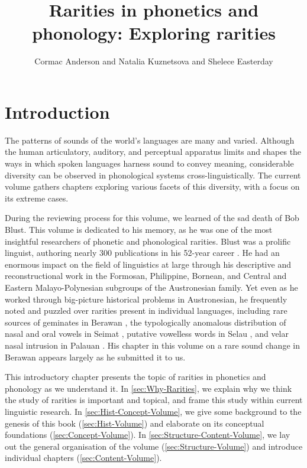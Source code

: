 \documentclass[output=paper]{langscibook}
\author{Cormac Anderson\orcid{}\affiliation{Surrey Morphology Group, University of Surrey; Max Planck Institute for Evolutionary Anthropology, Leipzig} and Natalia Kuznetsova\orcid{}\affiliation{Università Cattolica del Sacro Cuore, Milan; Institute for Linguistic Studies, Russian Academy of Sciences} and Shelece Easterday\orcid{}\affiliation{University of Hawaiʻi, Mānoa}}
\title[Rarities in phonetics and phonology]{Rarities in phonetics and phonology: Exploring rarities}
\begin{document}
\maketitle




\section{Introduction}
\label{sec:Introduction}

The patterns of sounds of the world's languages are many and varied. Although the human articulatory, auditory, and perceptual apparatus limits and shapes the ways in which spoken languages harness sound to convey meaning, considerable diversity can be observed in phonological systems cross-linguistically. The current volume gathers chapters exploring various facets of this diversity, with a focus on its extreme cases.

During the reviewing process for this volume, we learned of the sad death of Bob Blust. This volume is dedicated to his memory, as he was one of the most insightful researchers of phonetic and phonological rarities. Blust was a prolific linguist, authoring nearly 300 publications in his 52-year career \citep{LobelEtAl2022}. He had an enormous impact on the field of linguistics at large through his descriptive and reconstructional work in the Formosan, Philippine, Bornean, and Central and Eastern Malayo-Polynesian subgroups of the Austronesian family. Yet even as he worked through big-picture historical problems in Austronesian, he frequently noted and puzzled over rarities present in individual languages, including rare sources of geminates in Berawan \citep{Blust1995}, the typologically anomalous distribution of nasal and oral vowels in Seimat \citep{Blust1998}, putative vowelless words in Selau \citep{Blust2003}, and velar nasal intrusion in Palauan \citep{Blust2009}. His chapter in this volume on a rare sound change in Berawan appears largely as he submitted it to us.

\begin{sloppypar}
This introductory chapter presents the topic of rarities in phonetics and phonology as we understand it. In \cref{sec:Why-Rarities}, we explain why we think the study of rarities is important and topical, and frame this study within current linguistic research. In \cref{sec:Hist-Concept-Volume}, we give some background to the genesis of this book (\cref{sec:Hist-Volume}) and elaborate on its conceptual foundations (\cref{sec:Concept-Volume}). In \cref{sec:Structure-Content-Volume}, we lay out the general organisation of the volume (\cref{sec:Structure-Volume}) and introduce individual chapters (\cref{sec:Content-Volume}).
\end{sloppypar}
\end{document}
